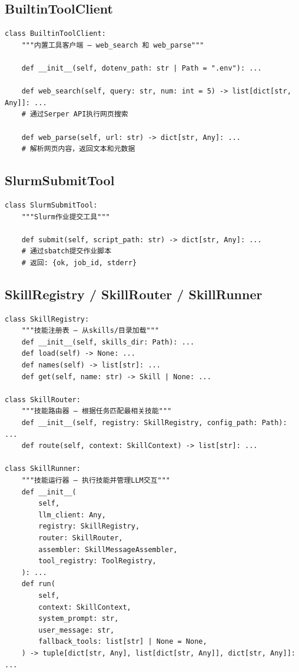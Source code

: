 \documentclass[12pt,a4paper]{ctexart}
\begin{document}
\subsection{BuiltinToolClient}

\begin{lstlisting}[caption={BuiltinToolClient 接口}]
class BuiltinToolClient:
    """内置工具客户端 — web_search 和 web_parse"""

    def __init__(self, dotenv_path: str | Path = ".env"): ...

    def web_search(self, query: str, num: int = 5) -> list[dict[str, Any]]: ...
    # 通过Serper API执行网页搜索

    def web_parse(self, url: str) -> dict[str, Any]: ...
    # 解析网页内容，返回文本和元数据
\end{lstlisting}

\subsection{SlurmSubmitTool}

\begin{lstlisting}[caption={SlurmSubmitTool 接口}]
class SlurmSubmitTool:
    """Slurm作业提交工具"""

    def submit(self, script_path: str) -> dict[str, Any]: ...
    # 通过sbatch提交作业脚本
    # 返回: {ok, job_id, stderr}
\end{lstlisting}

\subsection{SkillRegistry / SkillRouter / SkillRunner}

\begin{lstlisting}[caption={技能系统接口}]
class SkillRegistry:
    """技能注册表 — 从skills/目录加载"""
    def __init__(self, skills_dir: Path): ...
    def load(self) -> None: ...
    def names(self) -> list[str]: ...
    def get(self, name: str) -> Skill | None: ...

class SkillRouter:
    """技能路由器 — 根据任务匹配最相关技能"""
    def __init__(self, registry: SkillRegistry, config_path: Path): ...
    def route(self, context: SkillContext) -> list[str]: ...

class SkillRunner:
    """技能运行器 — 执行技能并管理LLM交互"""
    def __init__(
        self,
        llm_client: Any,
        registry: SkillRegistry,
        router: SkillRouter,
        assembler: SkillMessageAssembler,
        tool_registry: ToolRegistry,
    ): ...
    def run(
        self,
        context: SkillContext,
        system_prompt: str,
        user_message: str,
        fallback_tools: list[str] | None = None,
    ) -> tuple[dict[str, Any], list[dict[str, Any]], dict[str, Any]]: ...
\end{lstlisting}
\end{document}
